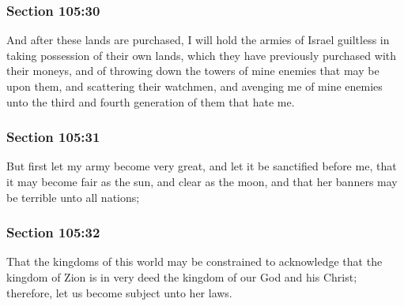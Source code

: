 	\subsubsection{Section 105:30} %
		\label{DC105-30}

		And after these lands are purchased, I will hold the armies of Israel guiltless in taking possession of their own lands, which they have previously purchased with their moneys, and of throwing down the towers of mine enemies that may be upon them, and scattering their watchmen, and avenging me of mine enemies unto the third and fourth generation of them that hate me.


	\subsubsection{Section 105:31} %
		\label{DC105-31}

		But first let my army become very great, and let it be sanctified before me, that it may become fair as the sun, and clear as the moon, and that her banners may be terrible unto all nations;


	\subsubsection{Section 105:32} %
		\label{DC105-32}

		That the kingdoms of this world may be constrained to acknowledge that the kingdom of Zion is in very deed the kingdom of our God and his Christ; therefore, let us become subject unto her laws.

